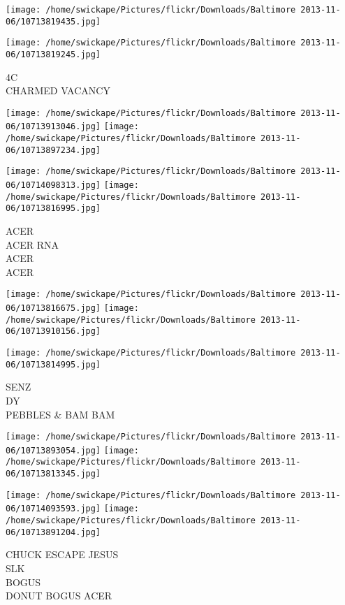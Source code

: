 \documentclass[10pt,letterpaper]{article}
\begin{document}
\texttt{[image: /home/swickape/Pictures/flickr/Downloads/Baltimore 2013-11-06/10713819435.jpg]}

\vspace{0.25in}
\texttt{[image: /home/swickape/Pictures/flickr/Downloads/Baltimore 2013-11-06/10713819245.jpg]}

4C\\
CHARMED VACANCY
\pagebreak

\texttt{[image: /home/swickape/Pictures/flickr/Downloads/Baltimore 2013-11-06/10713913046.jpg]}
\texttt{[image: /home/swickape/Pictures/flickr/Downloads/Baltimore 2013-11-06/10713897234.jpg]}

\texttt{[image: /home/swickape/Pictures/flickr/Downloads/Baltimore 2013-11-06/10714098313.jpg]}
\texttt{[image: /home/swickape/Pictures/flickr/Downloads/Baltimore 2013-11-06/10713816995.jpg]}

ACER\\
ACER RNA\\
ACER\\
ACER
\pagebreak

\texttt{[image: /home/swickape/Pictures/flickr/Downloads/Baltimore 2013-11-06/10713816675.jpg]}
\texttt{[image: /home/swickape/Pictures/flickr/Downloads/Baltimore 2013-11-06/10713910156.jpg]}

\vspace{0.25in}
\texttt{[image: /home/swickape/Pictures/flickr/Downloads/Baltimore 2013-11-06/10713814995.jpg]}

SENZ\\
DY\\
PEBBLES \& BAM BAM
\pagebreak

\texttt{[image: /home/swickape/Pictures/flickr/Downloads/Baltimore 2013-11-06/10713893054.jpg]}
\texttt{[image: /home/swickape/Pictures/flickr/Downloads/Baltimore 2013-11-06/10713813345.jpg]}

\texttt{[image: /home/swickape/Pictures/flickr/Downloads/Baltimore 2013-11-06/10714093593.jpg]}
\texttt{[image: /home/swickape/Pictures/flickr/Downloads/Baltimore 2013-11-06/10713891204.jpg]}

CHUCK ESCAPE JESUS\\
SLK\\
BOGUS\\
DONUT BOGUS ACER
\pagebreak
\end{document}
